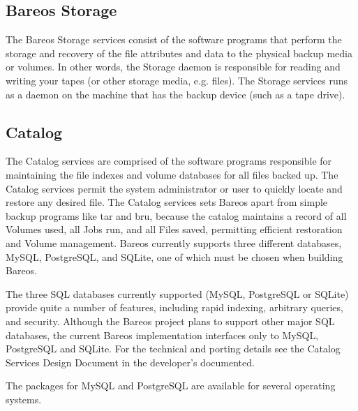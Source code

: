 \subsection*{Bareos Storage}
   \label{SDDef}
   The Bareos Storage services consist of the software programs that
   perform the storage and recovery of the file attributes and data to the
   physical backup media or volumes.  In other words, the Storage daemon is
   responsible for reading and writing your tapes (or other storage media,
   e.g.  files). The Storage services runs as
   a daemon on the machine that has the backup device (such as a tape
   drive).

\subsection*{Catalog}
   \label{DBDefinition}
   The Catalog services are comprised of the software programs
   responsible for maintaining the file indexes and volume databases for
   all files backed up.  The Catalog services permit the system
   administrator or user to quickly locate and restore any desired file.
   The Catalog services sets Bareos apart from simple backup programs like
   tar and bru, because the catalog maintains a record of all Volumes used,
   all Jobs run, and all Files saved, permitting efficient restoration and
   Volume management.  Bareos currently supports three different databases,
   MySQL, PostgreSQL, and SQLite, one of which must be chosen when building
   Bareos.

   The three SQL databases currently supported (MySQL, PostgreSQL or
   SQLite) provide quite a number of features, including rapid indexing,
   arbitrary queries, and security.  Although the Bareos project plans to support other
   major SQL databases, the current Bareos implementation interfaces only
   to MySQL, PostgreSQL and SQLite.  For the technical and porting details
   see the Catalog Services Design Document in the developer's documented.

   The packages for MySQL and PostgreSQL are available for several operating
   systems.

